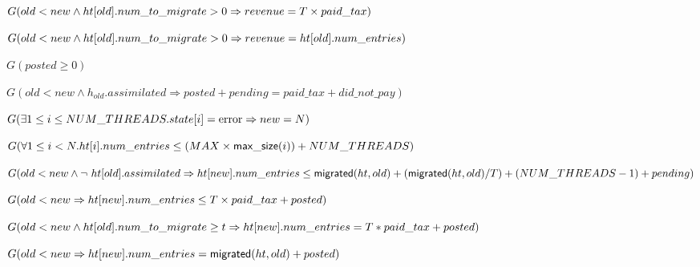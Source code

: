 \begin{lemma} %
  $G(old < new \wedge \mbox{$ht[old]$}.num\_to\_migrate > 0 \Rightarrow revenue = T \times paid\_tax)$
  \label{revenue4}    
\end{lemma}

\begin{lemma} %
  $G(old < new \wedge \mbox{$ht[old]$}.num\_to\_migrate > 0 \Rightarrow revenue = \mbox{$ht[old]$}.num\_entries)$
  \label{revenue5}  
\end{lemma}

\begin{lemma} %
  $G(posted \geq 0)$
  \label{posted0}  
\end{lemma}

\begin{lemma} %
  $G(old < new \wedge h_{old}.assimilated \Rightarrow posted+ pending = paid\_tax + did\_not\_pay)$
  \label{posted1}
\end{lemma}

\begin{lemma} %
  $G(\exists 1 \leq i \leq NUM\_THREADS. state[i] = \mbox{error} \Rightarrow new = N)$
  \label{final}  
\end{lemma}


\begin{lemma} %
  $G(\forall 1 \leq i < N. \mbox{$ht[i]$}.num\_entries \leq (MAX \times \mathsf{max\_size}(i)) + NUM\_THREADS)$
  \label{upper-global}
\end{lemma}

\begin{lemma} %
  $G(old < new \wedge \mbox{$\neg\ \mbox{$ht[old]$}.assimilated$} \Rightarrow \mbox{$ht[new]$}.num\_entries \leq \mathsf{migrated}(ht,old) + (\mathsf{migrated}(ht,old) / T) + (NUM\_THREADS -1) + pending)$
  \label{upper}
\end{lemma}

\begin{lemma} %
  $G(old < new \Rightarrow \mbox{$ht[new]$}.num\_entries \leq T \times paid\_tax + posted)$
  \label{upper-strengthening-2}
\end{lemma}

\begin{lemma} %
  $G(old < new \wedge \mbox{$ht[old]$}.num\_to\_migrate \geq t \Rightarrow \mbox{$ht[new]$}.num\_entries = T * paid\_tax + posted)$
  \label{upper-strengthening-3}  
\end{lemma}

\begin{lemma} %
  $G(old < new \Rightarrow \mbox{$ht[new]$}.num\_entries =\mathsf{migrated}(ht,old) + posted )$
  \label{upper-strengthening-5}  
\end{lemma}


